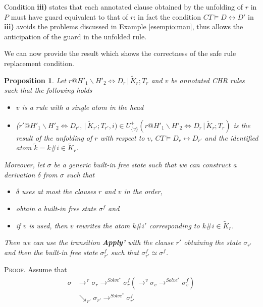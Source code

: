 \documentclass[final]{acmtrans2e}
\newtheorem{proposition}[theorem]{Proposition}
\newcommand{\rrarrow}{\longrightarrow}
\begin{document}
Condition {\bf iii)}  states that each annotated clause obtained by the
unfolding of $r$ in $P$ must have guard equivalent to that of $r$: in fact
the condition  $CT \models D \leftrightarrow D'$ in {\bf iii)} avoids the
problems discussed in Example \ref{esempio:mau}, thus allows the anticipation
of the guard in the unfolded rule.


We can now provide the result which shows the correctness of the safe rule replacement condition.

\begin{proposition}\label{lemma:servcomplete}
Let $r@H'_1\backslash H'_2 \Leftrightarrow  D_r\,|\,\tilde K_r; T_r $ and $v$ be annotated CHR rules such that the following holds
\begin{itemize}
  \item $v$ is a rule with a single atom in the head
  \item ($r'@ H'_1\backslash H'_2 \Leftrightarrow D_{r'}, \, |\, \tilde K_{r'}; T_{r'}, i)
\in U^{+}_{\{v \}}(r@H'_1\backslash H'_2 \Leftrightarrow  D_r\,|\,\tilde K_r; T_r )$  is the result
of the unfolding of $r$ with respect to $v$, $CT \models D_r \leftrightarrow D_{r'}$ and the identified atom $\tilde k= k\#i \in \tilde K_r$.
\end{itemize}
Moreover, let $\sigma$ be a generic built-in free state such that we can
construct a derivation $\delta$ from $\sigma$ such that
\begin{itemize}
  \item $\delta$ uses at most the clauses $r$ and $v$ in the order,
  \item obtain a built-in free state $\sigma^f$ and
  \item if $v$ is used, then $v$ rewrites the atom $k\#i'$ corresponding to $k\#i \in \tilde K_r$.
\end{itemize}
Then we can use the transition \textbf{Apply'} with the clause $r'$ obtaining the state $\sigma_{r'}$ and then the built-in free state $\sigma_{r'}^f$ such that $\sigma_{r'}^f \simeq \sigma^f$.
\end{proposition}


\textsc{Proof.}
Assume that
$$
\begin{array}{rl}
\sigma&\rrarrow^ {\, r}
\sigma_r \rrarrow^{Solve^{*}}
\sigma_r^f (\rrarrow^v
\sigma_v\rrarrow^{Solve^{*}}
\sigma_v^f)\\
&\searrow_{\, r'}\sigma_{r'}\rrarrow^{Solve^{*}}
\sigma_{r'}^f\\
\end{array}
$$
\end{document}
